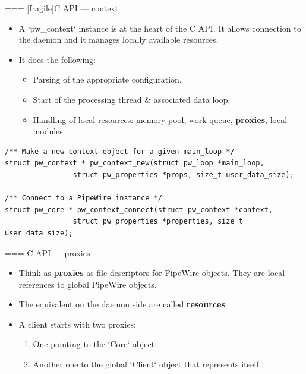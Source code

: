 === [fragile]{C API — context}
  \begin{itemize}

  \item A `pw_context` instance is at the heart of the C API. It
    allows connection to the daemon and it manages locally available
    resources.

  \item It does the following:

    \begin{itemize}
    \item Parsing of the appropriate configuration.
    \item Start of the processing thread \& associated data loop.
    \item Handling of local resources: memory pool, work queue,
      \textbf{proxies}, local modules
    \end{itemize}

  \end{itemize}

      \begin{block}{}
        \fontsize{9}{9}\selectfont
          \begin{verbatim}
/** Make a new context object for a given main_loop */
struct pw_context * pw_context_new(struct pw_loop *main_loop,
                struct pw_properties *props, size_t user_data_size);

/** Connect to a PipeWire instance */
struct pw_core * pw_context_connect(struct pw_context *context,
                struct pw_properties *properties, size_t user_data_size);
          \end{verbatim}
      \end{block}




=== {C API — proxies}
  \begin{itemize}

  \item Think as \textbf{proxies} as file descriptors for PipeWire
    objects. They are local references to global PipeWire objects.

  \item The equivalent on the daemon side are called \textbf{resources}.

  \item A client starts with two proxies:

    \begin{enumerate}
    \item One pointing to the `Core` object.
    \item Another one to the global `Client` object that represents
      itself.
    \end{enumerate}

  \end{itemize}




